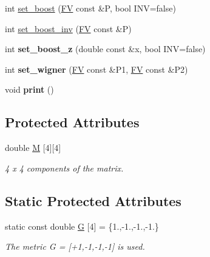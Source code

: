 \begin{DoxyCompactItemize}
\item 
int \hyperlink{classLT_a0f1f4b9fb6a2b084908abb6bc687cd4f}{set\+\_\+boost} (\hyperlink{classFV}{F\+V} const \&P, bool I\+N\+V=false)
\item 
int \hyperlink{classLT_a84cf79cd6014d4ecc645c1dcc0258b5e}{set\+\_\+boost\+\_\+inv} (\hyperlink{classFV}{F\+V} const \&P)
\item 
\hypertarget{classLT_a7dce276751d25954b2d249516d5191a4}{}int {\bfseries set\+\_\+boost\+\_\+z} (double const \&x, bool I\+N\+V=false)\label{classLT_a7dce276751d25954b2d249516d5191a4}

\item 
\hypertarget{classLT_a5a8d17a0e9374ba9cef862c1f98a5d62}{}int {\bfseries set\+\_\+wigner} (\hyperlink{classFV}{F\+V} const \&P1, \hyperlink{classFV}{F\+V} const \&P2)\label{classLT_a5a8d17a0e9374ba9cef862c1f98a5d62}

\item 
\hypertarget{classLT_a6687d255d8543565e26ae9bc37b4a414}{}void {\bfseries print} ()\label{classLT_a6687d255d8543565e26ae9bc37b4a414}

\end{DoxyCompactItemize}
\subsection*{Protected Attributes}
\begin{DoxyCompactItemize}
\item 
\hypertarget{classLT_adfe83a60779798fcb358f2fb12d79cda}{}double \hyperlink{classLT_adfe83a60779798fcb358f2fb12d79cda}{M} \mbox{[}4\mbox{]}\mbox{[}4\mbox{]}\label{classLT_adfe83a60779798fcb358f2fb12d79cda}

\begin{DoxyCompactList}\small\item\em 4 x 4 components of the matrix. \end{DoxyCompactList}\end{DoxyCompactItemize}
\subsection*{Static Protected Attributes}
\begin{DoxyCompactItemize}
\item 
\hypertarget{classLT_a3ec591d3e26134d35eb127d0610c7866}{}static const double \hyperlink{classLT_a3ec591d3e26134d35eb127d0610c7866}{G} \mbox{[}4\mbox{]} = \{1.,-\/1.,-\/1.,-\/1.\}\label{classLT_a3ec591d3e26134d35eb127d0610c7866}

\begin{DoxyCompactList}\small\item\em The metric G = \mbox{[}+1,-\/1,-\/1,-\/1\mbox{]} is used. \end{DoxyCompactList}\end{DoxyCompactItemize}


